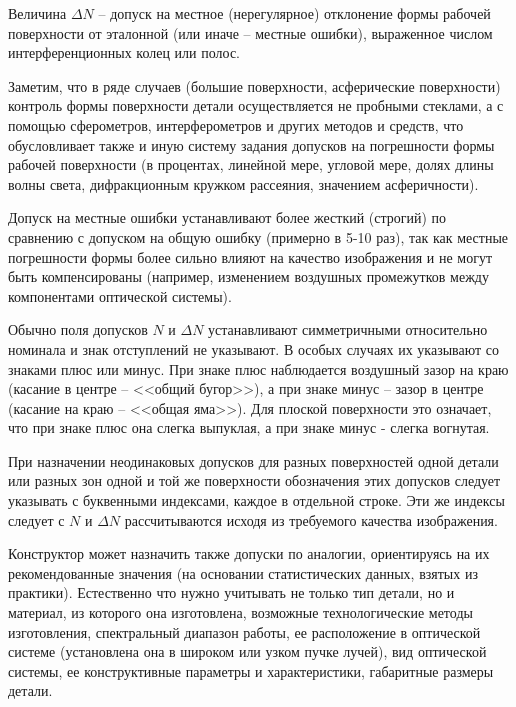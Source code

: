 \begin{enumerate}
	Величина $\Delta N$ -- допуск на местное (нерегулярное) отклонение формы рабочей поверхности от эталонной (или иначе -- местные ошибки), выраженное числом интерференционных колец или полос.
	
	Заметим, что в ряде случаев (большие поверхности, асферические поверхности) контроль формы поверхности детали осуществляется не пробными стеклами, а с помощью сферометров, интерферометров и других методов и средств, что обусловливает также и иную систему задания допусков на погрешности формы рабочей поверхности (в процентах, линейной мере, угловой мере, долях длины волны света, дифракционным кружком рассеяния, значением асферичности).
	
	Допуск на местные ошибки устанавливают более жесткий (строгий) по сравнению с допуском на общую ошибку (примерно в 5-10 раз), так как местные погрешности формы более сильно влияют на качество изображения и не могут быть компенсированы (например, изменением воздушных промежутков между компонентами оптической системы).
	
	Обычно поля допусков $N$ и $\Delta N$ устанавливают симметричными относительно номинала и знак отступлений не указывают. В особых случаях их указывают со знаками плюс или минус. При знаке плюс наблюдается воздушный зазор на краю (касание в центре -- <<общий бугор>>), а при знаке минус -- зазор в центре (касание на краю -- <<общая яма>>). Для плоской поверхности это означает, что при знаке плюс она слегка выпуклая, а при знаке минус - слегка вогнутая.
	
	При назначении неодинаковых допусков для разных поверхностей одной детали или разных зон одной и той же поверхности обозначения этих допусков следует указывать с буквенными индексами, каждое в отдельной строке. Эти же индексы следует с $N$ и $\Delta N$ рассчитываются исходя из требуемого качества изображения.
	
	Конструктор может назначить также допуски по аналогии, ориентируясь на их рекомендованные значения (на основании статистических данных, взятых из практики). Естественно что нужно учитывать не только тип детали, но и материал, из которого она изготовлена, возможные технологические методы изготовления, спектральный диапазон работы, ее расположение в оптической системе (установлена она в широком или узком пучке лучей), вид оптической системы, ее конструктивные параметры и характеристики, габаритные размеры детали.
	

\end{enumerate}
